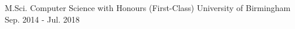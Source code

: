

\begin{cventries}

  \cventry
  {M.Sci. Computer Science with Honours (First-Class)} %
    {University of Birmingham} %
    {} %
    {Sep. 2014 - Jul. 2018} %
    {}\vspace{-\baselineskip}


\end{cventries}
